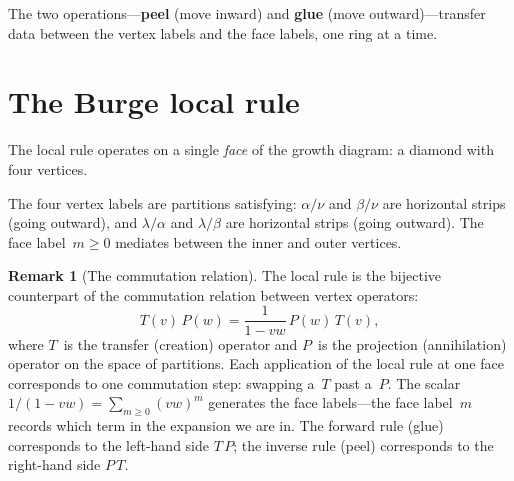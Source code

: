 \documentclass[11pt]{article}
\theoremstyle{plain}
\theoremstyle{definition}
\newtheorem{remark}[theorem]{Remark}
\begin{document}
The two operations---\textbf{peel} (move inward) and \textbf{glue}
(move outward)---transfer data between the vertex labels and the face
labels, one ring at a time.


\section{The Burge local rule}
\label{sec:burge}

The local rule operates on a single \emph{face} of the growth diagram:
a diamond with four vertices.

\begin{center}
\end{center}

The four vertex labels are partitions satisfying:
$\alpha/\nu$ and $\beta/\nu$ are horizontal strips (going outward),
and $\lambda/\alpha$ and $\lambda/\beta$ are horizontal strips (going
outward).  The face label~$m \geq 0$ mediates between the inner and
outer vertices.

\begin{remark}[The commutation relation]
\label{rmk:commutation}
The local rule is the bijective counterpart of the commutation
relation between vertex operators:
\[
  T(v)\, P(w) = \frac{1}{1 - vw}\, P(w)\, T(v),
\]
where $T$~is the transfer (creation) operator and $P$~is the
projection (annihilation) operator on the space of partitions.
Each application of the local rule at one face corresponds to
one commutation step: swapping a~$T$ past a~$P$.
The scalar $1/(1-vw) = \sum_{m \geq 0}(vw)^m$ generates the face
labels---the face label~$m$ records which term in the expansion
we are in.  The forward rule (glue) corresponds to the left-hand
side $T\,P$; the inverse rule (peel) corresponds to the
right-hand side $P\,T$.
\end{remark}
\end{document}
